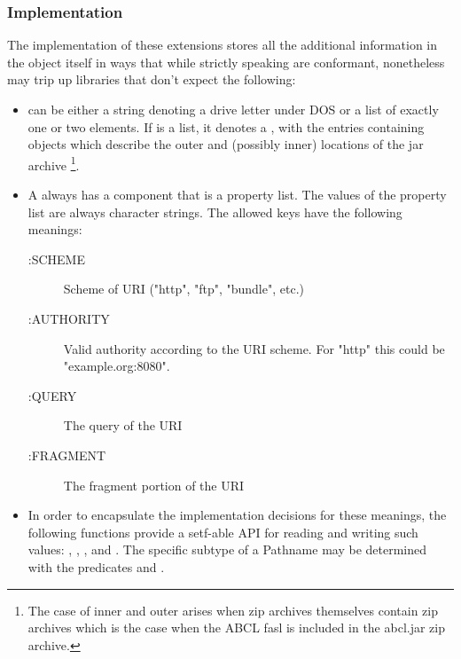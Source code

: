 \documentclass[10pt]{book}
\begin{document}
\subsubsection{Implementation}

The implementation of these extensions stores all the additional
information in the  object itself in ways that while strictly
speaking are conformant, nonetheless may trip up libraries that don't
expect the following:

\begin{itemize}
\item {} can be either a string denoting a drive letter
  under \textsc{DOS} or a list of exactly one or two elements.  If
   is a list, it denotes a , with
  the entries containing  objects which describe the
  outer and (possibly inner) locations of the jar
  archive \footnote{The case of inner and outer
     arises when zip archives themselves
    contain zip archives which is the case when the ABCL fasl is
    included in the abcl.jar zip archive.}.

\item A  always has a  component that is a
  property list.  The values of the  property list are
  always character strings.  The allowed keys have the following meanings:
  \begin{description}
  \item[:SCHEME] Scheme of URI ("http", "ftp", "bundle", etc.)
  \item[:AUTHORITY] Valid authority according to the URI scheme.  For
    "http" this could be "example.org:8080". 
  \item[:QUERY] The query of the \textsc{URI} 
  \item[:FRAGMENT] The fragment portion of the \textsc{URI}
  \end{description}

\item In order to encapsulate the implementation decisions for these
  meanings, the following functions provide a setf-able API for
  reading and writing such values: ,
  , , and
  .  The specific subtype of a Pathname may
  be determined with the predicates  and
  .

\label{EXTENSIONS:URL-PATHNAME-SCHEME}

\label{EXTENSIONS:URL-PATHNAME-FRAGMENT}

\label{EXTENSIONS:URL-PATHNAME-AUTHORITY}

\label{EXTENSIONS:PATHNAME-URL-P}

\label{EXTENSIONS:URL-PATHNAME-QUERY}

\end{itemize}
\end{document}

